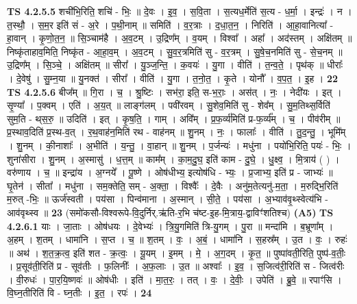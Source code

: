 \documentclass[17pt]{extarticle}
\begin{document}
                  \newline
                                \textbf{ TS 4.2.5.5} \newline
                  शची॑भि॒रिति॒ शचि॑ - भिः॒ ॥ दे॒वः । इ॒व॒ । स॒वि॒ता । स॒त्यध॒र्मेति॑ स॒त्य - ध॒र्मा॒ । इन्द्रः॑ । न । त॒स्थौ॒ । स॒म॒र इति॑ सं - अ॒रे । प॒थी॒नाम् ॥ समिति॑ । व॒र॒त्राः । द॒धा॒त॒न॒ । निरिति॑ । आ॒हा॒वानित्या᳚ - हा॒वान् । कृ॒णो॒त॒न॒ ॥ सि॒ञ्चाम॑है । अ॒व॒टम् । उ॒द्रिण᳚म् । व॒यम् । विश्वा᳚ । अहा᳚ । अद॑स्तम् । अक्षि॑तम् ॥ निष्कृ॑ताहाव॒मिति॒ निष्कृ॑त - आ॒हा॒व॒म् । अ॒व॒टम् । सु॒व॒र॒त्रमिति॑ सु - व॒र॒त्रम् । सु॒षे॒च॒नमिति॑ सु - से॒च॒नम् ॥ उ॒द्रिण᳚म् । सि॒ञ्चे॒ । अक्षि॑तम् ॥ सीरा᳚ । यु॒ञ्ज॒न्ति॒ । क॒वयः॑ । यु॒गा । वीति॑ । त॒न्व॒ते॒ । पृथ॑क् ॥ धीराः᳚ । दे॒वेषु॑ । सु॒म्न॒या ॥ यु॒नक्त॑ । सीरा᳚ । वीति॑ । यु॒गा । त॒नो॒त॒ । कृ॒ते । योनौ᳚ । व॒प॒त॒ । इ॒ह । \textbf{  22} \newline
                  \newline
                                \textbf{ TS 4.2.5.6} \newline
                  बीज᳚म् ॥ गि॒रा । च॒ । श्रु॒ष्टिः । सभ॑रा॒ इति॒ स-भ॒राः॒ । अस॑त् । नः॒ । नेदी॑यः । इत् । सृ॒ण्या᳚ । प॒क्वम् । एति॑ । अ॒य॒त् ॥ लाङ्ग॑लम् । पवी॑रवम् । सु॒शेव॒मिति॑ सु - शेव᳚म् । सु॒म॒तिथ्स॒र्विति॑ सुम॒ति - थ्‌स॒रु॒ ॥ उदिति॑ । इत् । कृ॒ष॒ति॒ । गाम् । अवि᳚म् । प्र॒फ॒र्व्य॑मिति॑ प्र-फ॒र्व्य᳚म् । च॒ । पीव॑रीम् ॥ प्र॒स्थाव॒दिति॑ प्र॒स्थ-व॒त् । र॒थ॒वाह॑न॒मिति॑ रथ - वाह॑नम् ॥ शु॒नम् । नः॒ । फालाः᳚ । वीति॑ । तु॒द॒न्तु॒ । भूमि᳚म् । शु॒नम् । की॒नाशाः᳚ । अ॒भीति॑ । य॒न्तु॒ । वा॒हान् ॥ शु॒नम् । प॒र्जन्यः॑ । मधु॑ना । पयो॑भि॒रिति॒ पयः॑ - भिः॒ । शुना॑सीरा । शु॒नम् । अ॒स्मासु॑ । ध॒त्त॒म् ॥ काम᳚म् । का॒म॒दु॒घ॒ इति॑ काम - दु॒घे॒ । धु॒क्ष्व॒ । मि॒त्राय॑ ( ) । वरु॑णाय । च॒ ॥ इन्द्रा॑य । अ॒ग्नये᳚ । पू॒ष्णे । ओष॑धीभ्य॒ इत्योष॑धि - भ्यः॒ । प्र॒जाभ्य॒ इति॑ प्र - जाभ्यः॑ ॥ घृ॒तेन॑ । सीता᳚ । मधु॑ना । सम॒क्तेति॒ सम् - अ॒क्ता॒ । विश्वैः᳚ । दे॒वैः । अनु॑म॒तेत्यनु॑-म॒ता॒ । म॒रुद्भि॒रिति॑ म॒रुत् -भिः॒ ॥ ऊर्ज॑स्वती । पय॑सा । पिन्व॑माना । अ॒स्मान् । सी॒ते॒ । पय॑सा । अ॒भ्याव॑वृ॒थ्स्वेत्य॑भि - आव॑वृथ्स्व ॥ \textbf{  23} \newline
                  \newline
                      (समो॑कसौ-विश्वरूपे-वि॒दुर्निर्.ऋ॑ति-र॒भि च॑ष्ट-इ॒ह-मि॒त्राय॒-द्वाविꣳ॑शतिश्च)  \textbf{(A5)} \newline \newline
                                \textbf{ TS 4.2.6.1} \newline
                  याः । जा॒ताः । ओष॑धयः । दे॒वेभ्यः॑ । त्रि॒यु॒गमिति॑ त्रि-यु॒गम् । पु॒रा ॥ मन्दा॑मि । ब॒भ्रूणा᳚म् । अ॒हम् । श॒तम् । धामा॑नि । स॒प्त । च॒ ॥ श॒तम् । वः॒ । अ॒बं॒ । धामा॑नि । स॒हस्र᳚म् । उ॒त । वः॒ । रुहः॑ ॥ अथ॑ । श॒त॒क्र॒त्व॒ इति॑ शत - क्र॒त्वः॒ । यू॒यम् । इ॒मम् । मे॒ । अ॒ग॒दम् । कृ॒त॒ ॥ पुष्पा॑वती॒रिति॒ पुष्प॑-व॒तीः॒ । प्र॒सूव॑ती॒रिति॑ प्र - सूव॑तीः । फ॒लिनीः᳚ । अ॒फ॒लाः । उ॒त ॥ अश्वाः᳚ । इ॒व॒ । स॒जित्व॑री॒रिति॑ स - जित्व॑रीः । वी॒रुधः॑ । पा॒र॒यि॒ष्णवः॑ ॥ ओष॑धीः । इति॑ । मा॒त॒रः॒ । तत् । वः॒ । दे॒वीः॒ । उपेति॑ । ब्रु॒वे॒ ॥ रपाꣳ॑सि । वि॒घ्न॒तीरिति॑ वि - घ्न॒तीः । इ॒त॒ । रपः॑ । \textbf{  24} \newline
\end{document}
